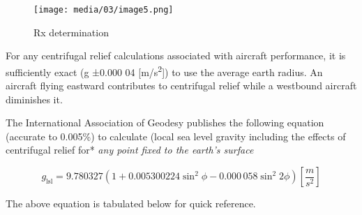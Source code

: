 \documentclass[
]{book}
\begin{document}
\begin{figure}
\centering
\texttt{[image: media/03/image5.png]}
\caption{Rx determination}
\end{figure}

For any centrifugal relief calculations associated with aircraft performance, it is sufficiently exact (g ±0.000 04 {[}m/s\textsuperscript{2}{]}) to use the average earth radius. An aircraft flying eastward contributes to centrifugal relief while a westbound aircraft diminishes it.

The International Association of Geodesy publishes the following equation (accurate to 0.005\%) to calculate (local sea level gravity including the effects of centrifugal relief for* \emph{any point fixed to the earth's surface}

\[
g_{\mathrm{lsl}} = 9.780 327 \left( 1 + 0.005 300 224 \sin^2{\phi} - 0.000\,058 \sin^2{2 \phi} \right) \left[ \frac{m}{s^2} \right]
\]

The above equation is tabulated below for quick reference.
\end{document}
